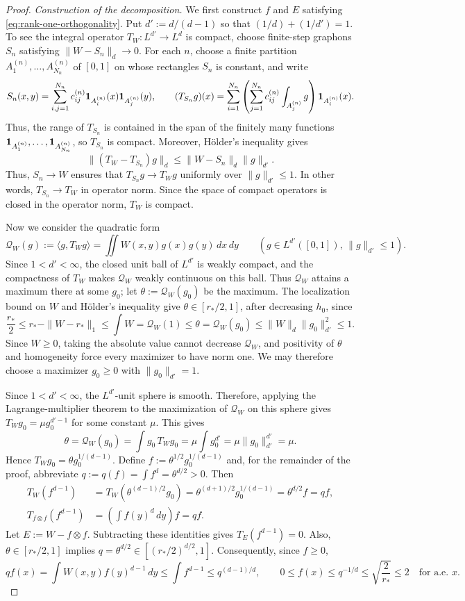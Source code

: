 \begin{proof}
\medskip
\noindent\emph{Construction of the decomposition.}
We first construct $f$ and $E$ satisfying \eqref{eq:rank-one-orthogonality}.
Put $d':=d/(d-1)$ so that $(1/d)+(1/d')=1$.
To see the integral operator $T_W:L^{d'}\longrightarrow L^d$ is compact,
choose finite-step graphons $S_n$ satisfying
$\|W-S_n\|_d\to0$.  For each $n$, choose a finite partition
$A_1^{(n)},\ldots,A_{N_n}^{(n)}$ of $[0,1]$ on whose rectangles $S_n$ is
constant, and write
\[
  S_n(x,y)=\sum_{i,j=1}^{N_n}c_{ij}^{(n)}
  \mathbf 1_{A_i^{(n)}}(x)\mathbf 1_{A_j^{(n)}}(y),
  \qquad
  (T_{S_n}g)(x)=\sum_{i=1}^{N_n} \left(\sum_{j=1}^{N_n}c_{ij}^{(n)}\int_{A_j^{(n)}}g\right) \mathbf 1_{A_i^{(n)}}(x).
\]
Thus, the range of $T_{S_n}$ is contained in the span of the finitely many
functions $\mathbf 1_{A_1^{(n)}},\ldots,\mathbf 1_{A_{N_n}^{(n)}}$, so $T_{S_n}$ is compact.
Moreover, H\"older's inequality gives
\[
  \|(T_W-T_{S_n})g\|_d
  \le\|W-S_n\|_d\|g\|_{d'}.
\]
Thus, $S_n\to W$ ensures that $T_{S_n}g\to T_Wg$ uniformly over
$\|g\|_{d'}\le1$.  In other words, $T_{S_n}\to T_W$ in operator norm.
Since the space of compact
operators is closed in the operator norm, $T_W$ is compact.

Now we consider the quadratic form
\[
  \mathcal Q_W(g):= \langle g,T_Wg\rangle =\iint W(x,y)g(x)g(y)\,dx\,dy
  \qquad
  (g \in L^{d'}([0,1]),\, \|g\|_{d'}\le1).
\]
Since $1<d'<\infty$, the closed unit ball of $L^{d'}$ is weakly compact,
and the compactness of $T_W$ makes $\mathcal Q_W$ weakly continuous on this ball.
Thus $\mathcal Q_W$ attains a maximum there at some $g_0$;
let $\theta:=\mathcal Q_W(g_0)$ be the maximum.
The localization bound on $W$ and H\"older's inequality give $\theta \in [r_*/2,1]$,
after decreasing $h_0$, since
\[
  \frac{r_*}{2} \le r_*-\|W-r_*\|_1 \le \int W=\mathcal Q_W(1)\le\theta
  = \mathcal Q_W(g_0)\le\|W\|_d\|g_0\|_{d'}^2\le 1.
\]
Since $W\ge0$, taking the absolute value cannot decrease $\mathcal Q_W$,
and positivity of $\theta$ and homogeneity force every maximizer to have norm
one.  We may therefore choose a maximizer $g_0\ge0$ with $\|g_0\|_{d'}=1$.

Since \(1<d'<\infty\), the \(L^{d'}\)-unit sphere is smooth.  Therefore, applying the
Lagrange-multiplier theorem to the maximization of $\mathcal Q_W$ on this sphere
gives \(T_Wg_0=\mu g_0^{d'-1}\) for some constant \(\mu\). This gives
\[
  \theta=\mathcal Q_W(g_0)=\int g_0\,T_Wg_0
  =\mu\int g_0^{d'}=\mu\|g_0\|_{d'}^{d'}=\mu.
\]
Hence $T_Wg_0=\theta g_0^{1/(d-1)}$.
Define $f:=\theta^{1/2}g_0^{1/(d-1)}$ and, for the remainder of the proof,
abbreviate $q:=q(f)=\int f^d=\theta^{d/2}>0$.  Then
\begin{align*}
  T_W(f^{d-1})
  &=T_W(\theta^{(d-1)/2}g_0)
  =\theta^{(d+1)/2}g_0^{1/(d-1)}
  =\theta^{d/2}f=qf,
  \\
  T_{f\otimes f}(f^{d-1})
  &=\left(\int f(y)^d\,dy\right)f
  =qf.
\end{align*}
Let $E:=W-f\otimes f$.  Subtracting these identities gives $T_E(f^{d-1})=0$.
Also, $\theta \in [r_*/2,1]$ implies $q = \theta^{d/2} \in [(r_*/2)^{d/2},1]$.
Consequently, since $f\ge0$,
\[
  qf(x)=\int W(x,y)f(y)^{d-1}\,dy
  \le\int f^{d-1}\le q^{(d-1)/d},
  \qquad
  0\le f(x)\le q^{-1/d}\le\sqrt{\frac{2}{r_*}} \le 2
  \quad\text{for a.e. }x.
\]


\end{proof}
